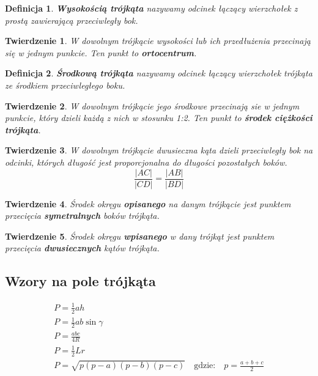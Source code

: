 \documentclass{report}
\newtheorem*{definition}{Definicja}
\newtheorem{theorem}{Twierdzenie}
\begin{document}
      \begin{definition}
        \textbf{Wysokością trójkąta} nazywamy odcinek łączący wierzchołek z prostą zawierającą przeciwległy bok.
      \end{definition}
      \begin{theorem}
        W dowolnym trójkącie wysokości lub ich przedłużenia przecinają się w jednym punkcie. Ten punkt to \textbf{ortocentrum}.
      \end{theorem}
      \begin{definition}
        \textbf{Środkową trójkąta} nazywamy odcinek łączący wierzchołek trójkąta ze środkiem przeciwległego boku.
      \end{definition}
      \begin{theorem}
        W dowolnym trójkącie jego środkowe przecinają sie w jednym punkcie, który dzieli każdą z nich w stosunku 1:2. Ten punkt to \textbf{środek ciężkości trójkąta}.
      \end{theorem}
      \begin{theorem}
        W dowolnym trójkącie dwusieczna kąta dzieli przeciwległy bok na odcinki, których długość jest proporcjonalna do długości pozostałych boków.
        \begin{equation}
          \frac{|AC|}{|CD|} = \frac{|AB|}{|BD|}
        \end{equation}
      \end{theorem}
      \begin{theorem}
        Środek okręgu \textbf{opisanego} na danym trójkącie jest punktem przecięcia \textbf{symetralnych} boków trójkąta.
      \end{theorem}
      \begin{theorem}
        Środek okręgu \textbf{wpisanego} w dany trójkąt jest punktem przecięcia \textbf{dwusiecznych} kątów trójkąta.
      \end{theorem}
      \subsection{Wzory na pole trójkąta}
        \begin{gather}
          P = \frac 12ah\\
          P = \frac 12ab\sin\gamma\\
          P = \frac{abc}{4R}\\
          P = \frac 12Lr\\
          P = \sqrt{p(p-a)(p-b)(p-c)}\quad\text{gdzie:}\quad p = \frac{a+b+c}{2}
        \end{gather}
\end{document}
